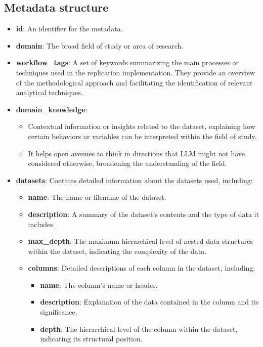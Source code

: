 \subsection{Metadata structure}
\begin{itemize}
    \item \textbf{id}: An identifier for the metadata.
    
    \item \textbf{domain}: The broad field of study or area of research.
    
    \item \textbf{workflow\_tags}: A set of keywords summarizing the main processes or techniques used in the replication implementation. They provide an overview of the methodological approach and facilitating the identification of relevant analytical techniques.
    
    \item \textbf{domain\_knowledge}: 
    \begin{itemize}
        \item Contextual information or insights related to the dataset, explaining how certain behaviors or variables can be interpreted within the field of study.
        \item It helps open avenues to think in directions that LLM might not have considered otherwise, broadening the understanding of the field.
    \end{itemize}
    
    \item \textbf{datasets}: Contains detailed information about the datasets used, including:
    \begin{itemize}
        \item \textbf{name}: The name or filename of the dataset.
        
        \item \textbf{description}: A summary of the dataset's contents and the type of data it includes.
        
        \item \textbf{max\_depth}: The maximum hierarchical level of nested data structures within the dataset, indicating the complexity of the data.
        
        \item \textbf{columns}: Detailed descriptions of each column in the dataset, including:
        \begin{itemize}
            \item \textbf{name}: The column's name or header.
            \item \textbf{description}: Explanation of the data contained in the column and its significance.
            \item \textbf{depth}: The hierarchical level of the column within the dataset, indicating its structural position.
        \end{itemize}
    \end{itemize}
    

\end{itemize}
